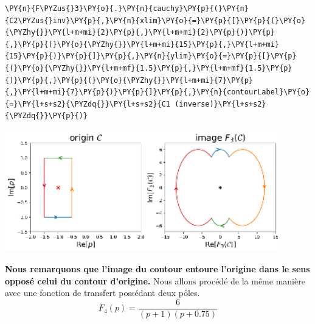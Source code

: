 \begin{tcolorbox}[breakable, size=fbox, boxrule=1pt, pad at break*=1mm,colback=cellbackground, colframe=cellborder]
\begin{Verbatim}[commandchars=\\\{\}]
\PY{n}{F\PYZus{}3}\PY{o}{.}\PY{n}{cauchy}\PY{p}{(}\PY{n}{C2\PYZus{}inv}\PY{p}{,}\PY{n}{xlim}\PY{o}{=}\PY{p}{[}\PY{p}{(}\PY{o}{\PYZhy{}}\PY{l+m+mi}{2}\PY{p}{,}\PY{l+m+mi}{2}\PY{p}{)}\PY{p}{,}\PY{p}{(}\PY{o}{\PYZhy{}}\PY{l+m+mi}{15}\PY{p}{,}\PY{l+m+mi}{15}\PY{p}{)}\PY{p}{]}\PY{p}{,}\PY{n}{ylim}\PY{o}{=}\PY{p}{[}\PY{p}{(}\PY{o}{\PYZhy{}}\PY{l+m+mf}{1.5}\PY{p}{,}\PY{l+m+mf}{1.5}\PY{p}{)}\PY{p}{,}\PY{p}{(}\PY{o}{\PYZhy{}}\PY{l+m+mi}{7}\PY{p}{,}\PY{l+m+mi}{7}\PY{p}{)}\PY{p}{]}\PY{p}{,}\PY{n}{contourLabel}\PY{o}{=}\PY{l+s+s2}{\PYZdq{}}\PY{l+s+s2}{C1 (inverse)}\PY{l+s+s2}{\PYZdq{}}\PY{p}{)}
\end{Verbatim}
\end{tcolorbox}
\begin{center}
    \includegraphics[width=0.9\textwidth]{notebook/fig/output_36_1.eps}
\end{center}
\textbf{Nous remarquons que l'image du contour entoure l'origine dans le
sens opposé celui du contour d'origine.} Nous allons procédé de la même
manière avec une fonction de transfert possédant deux pôles.
\[
F_4(p)=\dfrac{6}{(p+1)(p+0.75)}
\] 
